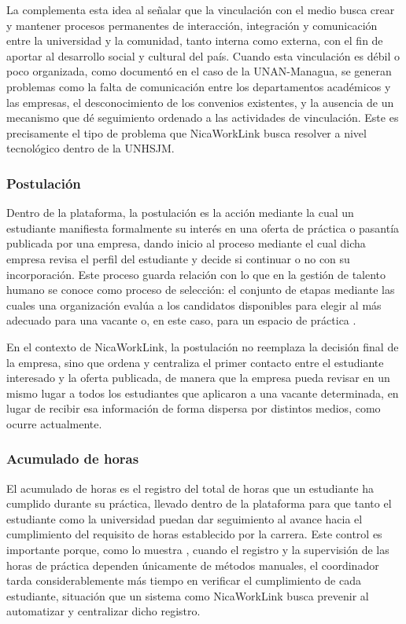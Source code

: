 La \textcite{uchile2017} complementa esta idea al señalar que la vinculación con el medio busca crear y mantener procesos permanentes de interacción, integración y comunicación entre la universidad y la comunidad, tanto interna como externa, con el fin de aportar al desarrollo social y cultural del país. Cuando esta vinculación es débil o poco organizada, como documentó \textcite{aleman2020} en el caso de la UNAN-Managua, se generan problemas como la falta de comunicación entre los departamentos académicos y las empresas, el desconocimiento de los convenios existentes, y la ausencia de un mecanismo que dé seguimiento ordenado a las actividades de vinculación. Este es precisamente el tipo de problema que NicaWorkLink busca resolver a nivel tecnológico dentro de la UNHSJM.

\subsubsection{Postulación}

Dentro de la plataforma, la postulación es la acción mediante la cual un estudiante manifiesta formalmente su interés en una oferta de práctica o pasantía publicada por una empresa, dando inicio al proceso mediante el cual dicha empresa revisa el perfil del estudiante y decide si continuar o no con su incorporación. Este proceso guarda relación con lo que en la gestión de talento humano se conoce como proceso de selección: el conjunto de etapas mediante las cuales una organización evalúa a los candidatos disponibles para elegir al más adecuado para una vacante o, en este caso, para un espacio de práctica \parencite{carazo2020}.

En el contexto de NicaWorkLink, la postulación no reemplaza la decisión final de la empresa, sino que ordena y centraliza el primer contacto entre el estudiante interesado y la oferta publicada, de manera que la empresa pueda revisar en un mismo lugar a todos los estudiantes que aplicaron a una vacante determinada, en lugar de recibir esa información de forma dispersa por distintos medios, como ocurre actualmente.

\subsubsection{Acumulado de horas}

El acumulado de horas es el registro del total de horas que un estudiante ha cumplido durante su práctica, llevado dentro de la plataforma para que tanto el estudiante como la universidad puedan dar seguimiento al avance hacia el cumplimiento del requisito de horas establecido por la carrera. Este control es importante porque, como lo muestra \textcite{torresremon2022}, cuando el registro y la supervisión de las horas de práctica dependen únicamente de métodos manuales, el coordinador tarda considerablemente más tiempo en verificar el cumplimiento de cada estudiante, situación que un sistema como NicaWorkLink busca prevenir al automatizar y centralizar dicho registro.

